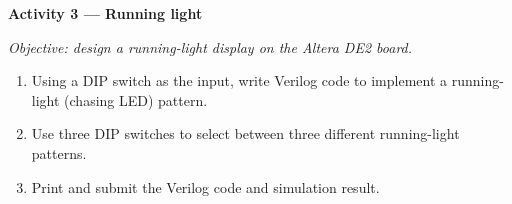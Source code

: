 \begin{procedure}
  \textbf{Activity 3 --- Running light}\vspace{2pt}

  \textit{Objective: design a running-light display on the Altera DE2 board.}

  \begin{enumerate}
    \item Using a DIP switch as the input, write Verilog code to implement a running-light (chasing LED) pattern.
    \item Use three DIP switches to select between three different running-light patterns.
    \item Print and submit the Verilog code and simulation result.
  \end{enumerate}

\end{procedure}
